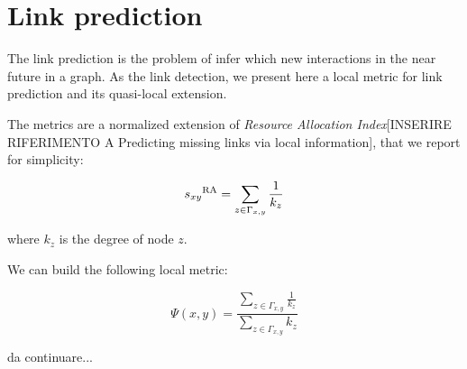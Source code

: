 \section{Link prediction}
\label{sec:link-prediction}

The link prediction is the problem of infer which new interactions in the near future in a graph.
As the link detection, we present here a local metric for link prediction and its quasi-local extension.

The metrics are a normalized extension of \textit{Resource Allocation Index}[INSERIRE RIFERIMENTO A Predicting missing links via local information], that we report for simplicity:

\begin{equation}
\label{eqn:resource-allocation}
s_{xy}\textsuperscript{RA} = 
\sum\limits_{z\in\Gamma_{x,y}}\frac{1}{k_{z}}
\end{equation}

where $k_{z}$ is the degree of node $z$.

We can build the following local metric:

\begin{equation}
\label{eqn:prediction-local}
\Psi(x,y)=
\frac{\sum\limits_{z\in\Gamma_{x,y}}\frac{1}{k_{z}}}
{\sum\limits_{z\in\Gamma_{x,y}}k_{z}}
\end{equation}

da continuare...
